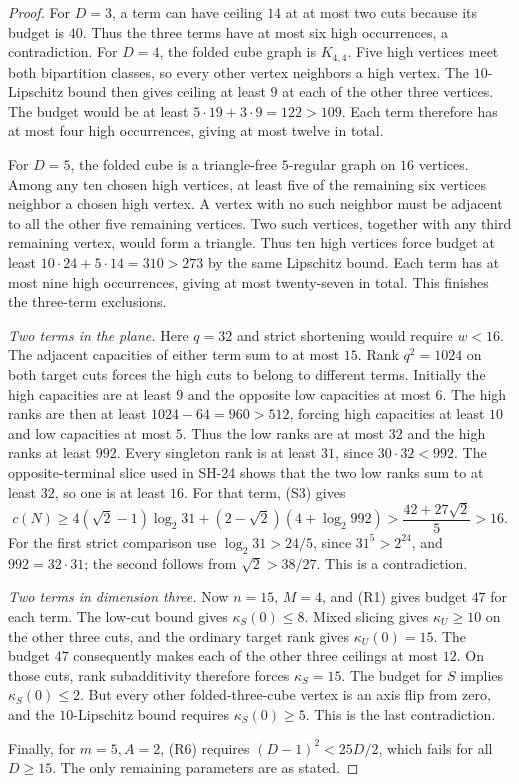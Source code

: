 \begin{proof}
For $D=3$, a term can have ceiling $14$ at at most two
cuts because its budget is $40$.  Thus the three terms
have at most six high occurrences, a contradiction.
For $D=4$, the folded cube graph is $K_{4,4}$.
Five high vertices meet both bipartition classes, so
every other vertex neighbors a high vertex.  The
$10$-Lipschitz bound then gives ceiling at least $9$
at each of the other three vertices.  The budget would
be at least $5\cdot19+3\cdot9=122>109$.
Each term therefore has at most four high occurrences,
giving at most twelve in total.

For $D=5$, the folded cube is a triangle-free
$5$-regular graph on $16$ vertices.  Among any ten
chosen high vertices, at least five of the remaining
six vertices neighbor a chosen high vertex.  A vertex
with no such neighbor must be adjacent to all the other
five remaining vertices.  Two such vertices, together
with any third remaining vertex, would form a triangle.
Thus ten high vertices force budget at least
$10\cdot24+5\cdot14=310>273$ by the same Lipschitz
bound.  Each term has at most nine high occurrences,
giving at most twenty-seven in total.  This finishes
the three-term exclusions.

\emph{Two terms in the plane.}
Here $q=32$ and strict shortening would require $w<16$.
The adjacent capacities of either term sum to at most
$15$.  Rank $q^2=1024$ on both target cuts forces the
high cuts to belong to different terms.  Initially
the high capacities are at least $9$ and the opposite
low capacities at most $6$.  The high ranks are then
at least $1024-64=960>512$, forcing high capacities
at least $10$ and low capacities at most $5$.
Thus the low ranks are at most $32$ and the high
ranks at least $992$.  Every singleton rank is at
least $31$, since $30\cdot32<992$.
The opposite-terminal slice used in SH-24 shows that
the two low ranks sum to at least $32$, so one is
at least $16$.  For that term, (S3) gives
\[
 c(N)\ge4(\sqrt2-1)\log_2 31
 +(2-\sqrt2)(4+\log_2 992)
 >\frac{42+27\sqrt2}{5}>16.
\]
For the first strict comparison use
$\log_2 31>24/5$, since $31^5>2^{24}$,
and $992=32\cdot31$; the second follows from
$\sqrt2>38/27$.  This is a contradiction.

\emph{Two terms in dimension three.}
Now $n=15$, $M=4$, and (R1) gives budget $47$ for
each term.  The low-cut bound gives
$\kappa_S(0)\le8$.  Mixed slicing gives
$\kappa_U\ge10$ on the other three cuts, and the
ordinary target rank gives $\kappa_U(0)=15$.
The budget $47$ consequently makes each of the
other three ceilings at most $12$.  On those cuts,
rank subadditivity therefore forces $\kappa_S=15$.
The budget for $S$ implies $\kappa_S(0)\le2$.
But every other folded-three-cube vertex is an axis
flip from zero, and the $10$-Lipschitz bound requires
$\kappa_S(0)\ge5$.  This is the last contradiction.

Finally, for $m=5,A=2$, (R6) requires
$(D-1)^2<25D/2$, which fails for all $D\ge15$.
The only remaining parameters are as stated.
\end{proof}

